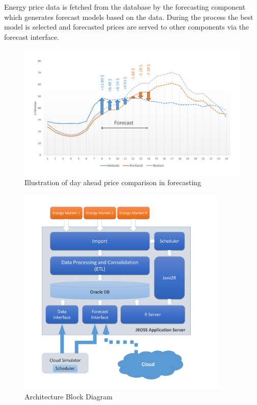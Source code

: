 \documentclass[paper=a4, fontsize=11pt]{scrartcl} %
\numberwithin{equation}{section} %
\numberwithin{figure}{section} %
\numberwithin{table}{section} %
\begin{document}
Energy price data is fetched from the database by the forecasting component which generates forecast models based on the data. During the process the best model is selected and forecasted prices are served to other components via the forecast interface. 

\hspace{4cm}

\begin{figure}[htbp]
	\centering
		\includegraphics[width=\textwidth]{figures/Da_Prices_Forecast_Illustrated.png}
	\caption{Illustration of day ahead price comparison in forecasting}
	\label{fig:Da_Prices_Forecast}
\end{figure}

\begin{figure}[htbp]
	\centering
		\includegraphics[width=0.9\textwidth]{figures/Block_Diagram_Architecture.pdf}
	\caption{Architecture Block Diagram}
	\label{fig:Block_Diagram_Architecture}
\end{figure}
\end{document}
